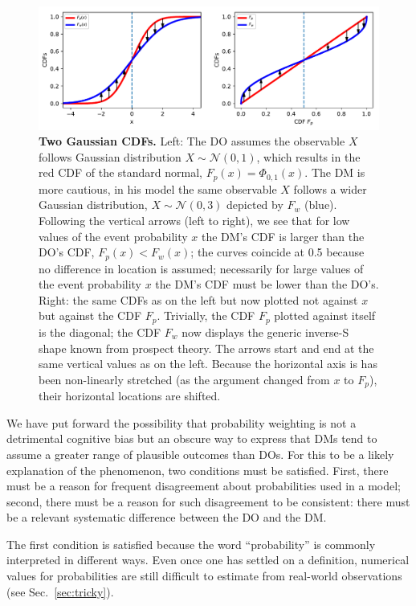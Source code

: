 \documentclass[a4paper, 12pt]{article}
\newcommand{\flabel}[1]{\label{fig:#1}}
\newcommand{\secref}[1]{Sec.~\ref{sec:#1}}
\newcommand{\ND}{\mathcal{N}} %
\begin{document}
\begin{figure}[!htb]
\centering
\includegraphics[width=\textwidth]{./figs/GaussianFvsXtoWvsP.pdf}
\caption{{\bf Two Gaussian CDFs.} 
Left: The DO assumes the observable $X$ follows Gaussian distribution $X \sim \ND(0,1)$, which results in the red CDF of the standard normal, $F_p(x) = \Phi_{0,1}(x)$. The DM is more cautious, in his model the same observable $X$ follows a wider Gaussian distribution, $X \sim \ND(0,3)$ depicted by $F_w$ (blue). 
% 
Following the vertical arrows (left to right), we see that for low values of the event probability $x$ the DM's CDF is larger than the DO's CDF, $F_p(x) < F_w(x)$; the curves coincide at 0.5 because no difference in location is assumed; necessarily for large values of the event probability $x$ the DM's CDF must be lower than the DO's.
Right: the same CDFs as on the left but now plotted not against $x$ but against the CDF $F_p$. Trivially, the CDF $F_p$ plotted against itself is the diagonal; the CDF $F_w$ now displays the generic inverse-S shape known from prospect theory. The arrows start and end at the same vertical values as on the left. Because the horizontal axis is has been non-linearly stretched (as the argument changed from $x$ to $F_p$), their horizontal locations are shifted.
}
\flabel{TwoCDFs}
\end{figure}

We have put forward the possibility that probability weighting is not a detrimental cognitive bias but an obscure way to express that DMs tend to assume a greater range of plausible outcomes than DOs. For this to be a likely explanation of the phenomenon, two conditions must be satisfied. First, there must be a reason for frequent disagreement about probabilities used in a model; second, there must be a reason for such disagreement to be consistent: there must be a relevant systematic difference between the DO and the DM. 

The first condition is satisfied because the word ``probability'' is commonly interpreted in different ways. Even once one has settled on a definition, numerical values for probabilities are still difficult to estimate from real-world observations (see \secref{tricky}).
\end{document}
